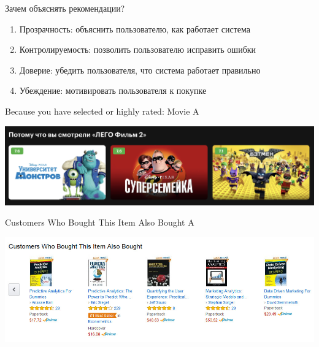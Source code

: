 \documentclass[11pt,aspectratio=169,handout]{beamer}
\begin{document}
\begin{frame}{Зачем объяснять рекомендации?}

\begin{enumerate}[<+->]
\item Прозрачность: объяснить пользователю, как работает система
\item Контролируемость: позволить пользователю исправить ошибки
\item Доверие: убедить пользователя, что система работает правильно
\item Убеждение: мотивировать пользователя к покупке
\end{enumerate}

\end{frame}

\begin{frame}

\begin{tcolorbox}[colback=info!5,colframe=info!80,title=Case-based]
Because you have selected or highly rated: Movie A
\end{tcolorbox}

\vfill

\begin{center}
\includegraphics[scale=0.3]{images/netflix.png}
\end{center}

\end{frame}

\begin{frame}

\begin{tcolorbox}[colback=info!5,colframe=info!80,title=Collaborative]
Customers Who Bought This Item Also Bought A
\end{tcolorbox}

\vfill

\begin{center}
\includegraphics[scale=0.3]{images/amazon.jpeg}
\end{center}

\end{frame}
\end{document}
